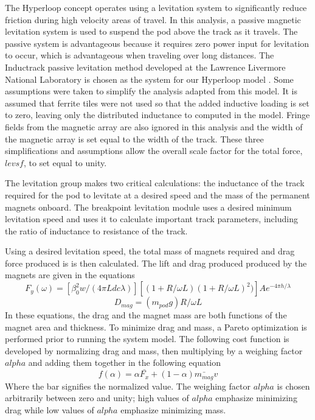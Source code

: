 	The Hyperloop concept operates using a levitation system to significantly
	reduce friction during high velocity areas of travel. In this analysis, a
	passive magnetic levitation system is used to suspend the pod above the
	track as it travels. The passive system is advantageous because it requires
	zero power input for levitation to occur, which is advantageous when
	traveling over long distances. The Inductrack passive levitation method
	developed at the Lawrence Livermore National Laboratory is chosen as the
	system for our Hyperloop model \cite{inductrack}. Some assumptions were
	taken to simplify the analysis adapted from this model. It is assumed that
	ferrite tiles were not used so that the added inductive loading is set to
	zero, leaving only the distributed inductance to computed in the model.
	Fringe fields from the magnetic array are also ignored in this analysis and
	the width of the magnetic array is set equal to the width of the track.
	These three simplifications and assumptions allow the overall scale factor
	for the total force, $levsf$, to set equal to unity.

	The levitation group makes two critical calculations: the inductance of the
	track required for the pod to levitate at a desired speed and the mass of
	the permanent magnets onboard. The breakpoint levitation module uses a
	desired minimum levitation speed and uses it to calculate important track
	parameters, including the ratio of inductance to resistance of the track.

	Using a desired levitation speed, the total mass of magnets required and
	drag force produced is is then calculated. The lift and drag produced
	produced by the magnets are given in the equations
	\begin{equation}
		\label{eq:fy_lev}
		F_{y}(\omega)=[\beta _{0}^{2}w/(4\pi Ldc\lambda )][( 1+R/\omega L)(1+R/\omega L)^{2})]Ae^{-4\pi h/\lambda }
	\end{equation}
	\begin{equation}
		\label{eq:dmag}
		D_{mag}=( m_{pod}g)R/\omega L
	\end{equation}
	In these equations, the drag and the magnet mass are both functions of the
	magnet area and thickness. To minimize drag and mass, a Pareto optimization
	is performed prior to running the system model. The following cost function
	is developed by normalizing drag and mass, then multiplying by a weighing
	factor $alpha$ and adding them together in the following equation
	\begin{equation}
		\label{eq:pareto}
		f(\alpha ) = \alpha \bar{F_{x}} + (1-\alpha )\bar{m_{mag}}v
	\end{equation}
	Where the bar signifies the normalized value. The weighing factor $alpha$
	is chosen arbitrarily between zero and unity; high values of $alpha$
	emphasize minimizing drag while low values of $alpha$ emphasize minimizing mass.




